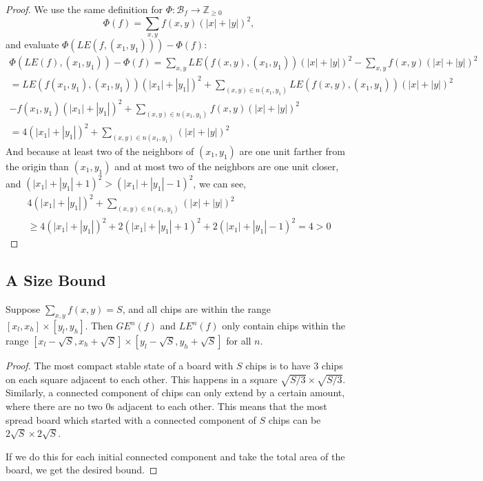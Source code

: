\documentclass[runningheads,a4paper]{llncs}
\begin{document}
\begin{proof}
We use the same definition for $\Phi: \mathcal{B}_f \rightarrow \mathbb{Z}_{\geq 0}$ 
\[ \Phi(f) = \sum_{x,y} f(x,y)(|x|+|y|)^2, \]
and evaluate $\Phi(LE(f, (x_1,y_1))) - \Phi(f)$:
\begin{align}
\Phi(LE(f), (x_1, y_1)) - \Phi(f) =\sum_{x,y} LE(f(x,y), (x_1, y_1))(|x|+|y|)^2 - \sum_{x,y} f(x,y)(|x|+|y|)^2 \\
= LE(f(x_1,y_1), (x_1, y_1))(|x_1|+|y_1|)^2 + \sum_{(x,y) \in n(x_1,y_1)} LE(f(x,y), (x_1, y_1))(|x|+|y|)^2 \\- f(x_1,y_1)(|x_1|+|y_1|)^2 + \sum_{(x,y) \in n(x_1, y_1)} f(x,y)(|x|+|y|)^2 \\
= 4(|x_1| + |y_1|)^2 +\sum_{(x,y) \in n(x_1, y_1)} (|x| + |y|)^2
\end{align}
And because at least two of the neighbors of $(x_1, y_1)$ are one unit farther from the origin than $(x_1, y_1)$ and at most two of the neighbors are one unit closer, and $(|x_1|+|y_1| +1)^2 > (|x_1|+|y_1| - 1)^2$, we can see,
\begin{align}
4(|x_1| + |y_1|)^2 +\sum_{(x,y) \in n(x_1, y_1)} (|x| + |y|)^2  \\ 
\geq 4(|x_1| + |y_1|)^2 + 2 (|x_1| + |y_1|+1)^2 + 2 (|x_1| + |y_1|-1)^2 = 4 >0
\end{align}
\end{proof}

\subsection{A Size Bound}
\begin{lemma}
\label{finiteextension}
Suppose $\sum_{x,y} f(x,y) = S$, and all chips are within the range $[x_l, x_h] \times [y_l, y_h]$. Then $GE^n(f)$ and $LE^n(f)$ only contain chips within the range $[x_l - \sqrt{S}, x_h + \sqrt{S}] \times [y_l-\sqrt{S}, y_h+\sqrt{S}]$ for all $n$.
\end{lemma}

\begin{proof}
The most compact stable state of a board with $S$ chips is to have $3$ chips on each square adjacent to each other. This happens in a square $\sqrt{S/3} \times \sqrt{S/3}$. Similarly, a connected component of chips can only extend by a certain amount, where there are no two 0s adjacent to each other. This means that the most spread board which started with a connected component of $S$ chips can be $2\sqrt{S} \times 2\sqrt{S}$. 

If we do this for each initial connected component and take the total area of the board, we get the desired bound.
\end{proof}
\end{document}
